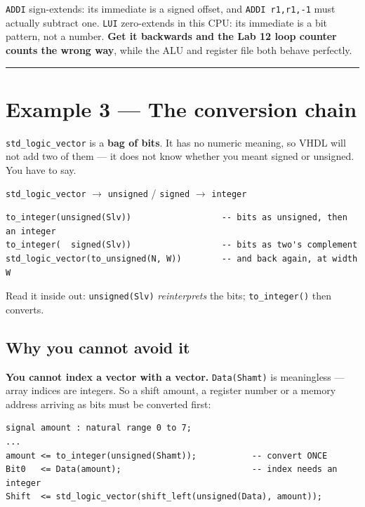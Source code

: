 \documentclass[11pt]{article}
\newcommand{\code}[1]{\texttt{#1}}
\newcommand{\hr}{\vspace{2pt}\hrule\vspace{6pt}}
\begin{document}
\code{ADDI} sign-extends: its immediate is a signed offset, and
\code{ADDI r1,r1,-1} must actually subtract one. \code{LUI} zero-extends in this
CPU: its immediate is a bit pattern, not a number. \textbf{Get it backwards and
the Lab 12 loop counter counts the wrong way}, while the ALU and register file
both behave perfectly.

\vspace{4pt}\hr

\section*{Example 3 --- The conversion chain}

\code{std\_logic\_vector} is a \textbf{bag of bits}. It has no numeric meaning, so
VHDL will not add two of them --- it does not know whether you meant signed or
unsigned. You have to say.

\begin{center}
\code{std\_logic\_vector} $\longrightarrow$ \code{unsigned} / \code{signed}
$\longrightarrow$ \code{integer}
\end{center}

\begin{lstlisting}
to_integer(unsigned(Slv))                  -- bits as unsigned, then an integer
to_integer(  signed(Slv))                  -- bits as two's complement
std_logic_vector(to_unsigned(N, W))        -- and back again, at width W
\end{lstlisting}

Read it inside out: \code{unsigned(Slv)} \emph{reinterprets} the bits;
\code{to\_integer()} then converts.

\subsection*{Why you cannot avoid it}

\textbf{You cannot index a vector with a vector.} \code{Data(Shamt)} is
meaningless --- array indices are integers. So a shift amount, a register number
or a memory address arriving as bits must be converted first:

\begin{lstlisting}
signal amount : natural range 0 to 7;
...
amount <= to_integer(unsigned(Shamt));           -- convert ONCE
Bit0   <= Data(amount);                          -- index needs an integer
Shift  <= std_logic_vector(shift_left(unsigned(Data), amount));
\end{lstlisting}
\end{document}
